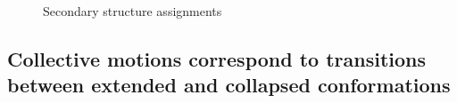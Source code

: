 \begin{figure}
	\thispagestyle{empty}
	\centering     %
	\caption{Secondary structure assignments}
	\clearpage
\end{figure}





\subsection{Collective motions correspond to transitions between extended and collapsed conformations}



